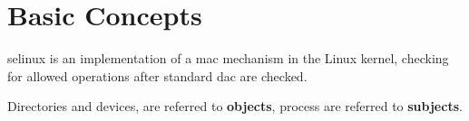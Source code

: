 \section{Basic Concepts}
\gls{selinux} is an implementation of a \gls{mac} mechanism in the Linux 
kernel, checking for allowed operations after standard \gls{dac} are checked.

Directories and devices, are referred to \textbf{objects}, process are 
referred to \textbf{subjects}.
